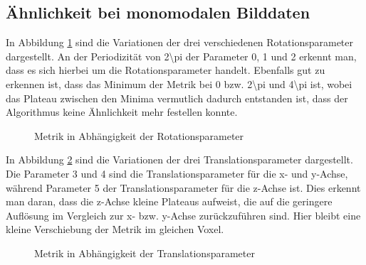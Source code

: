 \subsection{Ähnlichkeit bei monomodalen Bilddaten}
In Abbildung \ref{fig:ct2ct_rotparam} sind die Variationen der drei
verschiedenen Rotationsparameter dargestellt. An der Periodizität von
\num{2\pi} der Parameter \num{0}, \num{1} und \num{2} erkennt man, dass es
sich hierbei um die Rotationsparameter handelt. Ebenfalls gut zu erkennen ist,
dass das Minimum der Metrik bei \num{0} bzw. \num{2\pi} und \num{4\pi} ist,
wobei das Plateau zwischen den Minima vermutlich dadurch entstanden ist, dass
der Algorithmus keine Ähnlichkeit mehr festellen konnte.
\begin{figure}[h]
  \caption{Metrik in Abhängigkeit der Rotationsparameter}
  \label{fig:ct2ct_rotparam}
  \vspace{-10pt}
  \resizebox{0.32\linewidth}{!}{}
  \hfill
  \resizebox{0.32\linewidth}{!}{}
  \hfill
  \resizebox{0.32\linewidth}{!}{}
  \vspace{-10pt}
\end{figure}
\newpage
In Abbildung \ref{fig:ct2ct_translparam} sind die Variationen der drei
Translationsparameter dargestellt. Die Parameter \num{3} und \num{4} sind die
Translationsparameter für die x- und y-Achse, während Parameter \num{5} der
Translationsparameter für die z-Achse ist. Dies erkennt man daran, dass die
z-Achse kleine Plateaus aufweist, die auf die geringere Auflösung im Vergleich
zur x- bzw. y-Achse zurückzuführen sind. Hier bleibt eine kleine Verschiebung
der Metrik im gleichen Voxel.
\begin{figure}[h]
  \caption{Metrik in Abhängigkeit der Translationsparameter}
  \label{fig:ct2ct_translparam}
  \vspace{-10pt}
  \resizebox{0.32\linewidth}{!}{}
  \hfill
  \resizebox{0.32\linewidth}{!}{}
  \hfill
  \resizebox{0.32\linewidth}{!}{}
  \vspace{-10pt}
\end{figure}

